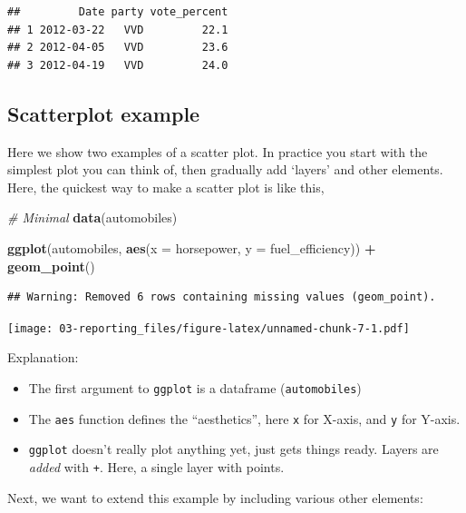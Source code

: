 \documentclass[]{book}
\newenvironment{Shaded}{\begin{snugshade}}{\end{snugshade}}
\newcommand{\CommentTok}[1]{\textcolor[rgb]{0.56,0.35,0.01}{\textit{#1}}}
\newcommand{\DataTypeTok}[1]{\textcolor[rgb]{0.13,0.29,0.53}{#1}}
\newcommand{\KeywordTok}[1]{\textcolor[rgb]{0.13,0.29,0.53}{\textbf{#1}}}
\newcommand{\NormalTok}[1]{#1}
\newcommand{\OperatorTok}[1]{\textcolor[rgb]{0.81,0.36,0.00}{\textbf{#1}}}
\newcommand{\StringTok}[1]{\textcolor[rgb]{0.31,0.60,0.02}{#1}}
\providecommand{\tightlist}{%
  \setlength{\itemsep}{0pt}\setlength{\parskip}{0pt}}
\begin{document}
\begin{verbatim}
##         Date party vote_percent
## 1 2012-03-22   VVD         22.1
## 2 2012-04-05   VVD         23.6
## 3 2012-04-19   VVD         24.0
\end{verbatim}

\hypertarget{scatterplot-example}{%
\subsection{Scatterplot example}\label{scatterplot-example}}

Here we show two examples of a scatter plot. In practice you start with the simplest plot you can think of, then gradually add `layers' and other elements. Here, the quickest way to make a scatter plot is like this,

\begin{Shaded}
\begin{Highlighting}[]
\CommentTok{# Minimal}
\KeywordTok{data}\NormalTok{(automobiles)}

\KeywordTok{ggplot}\NormalTok{(automobiles, }\KeywordTok{aes}\NormalTok{(}\DataTypeTok{x =}\NormalTok{ horsepower, }\DataTypeTok{y =}\NormalTok{ fuel_efficiency)) }\OperatorTok{+}
\StringTok{  }\KeywordTok{geom_point}\NormalTok{()}
\end{Highlighting}
\end{Shaded}

\begin{verbatim}
## Warning: Removed 6 rows containing missing values (geom_point).
\end{verbatim}

\texttt{[image: 03-reporting\_files/figure-latex/unnamed-chunk-7-1.pdf]}

Explanation:

\begin{itemize}
\tightlist
\item
  The first argument to \texttt{ggplot} is a dataframe (\texttt{automobiles})
\item
  The \texttt{aes} function defines the ``aesthetics'', here \texttt{x} for X-axis, and \texttt{y} for Y-axis.
\item
  \texttt{ggplot} doesn't really plot anything yet, just gets things ready. Layers are \emph{added} with \texttt{+}. Here, a single layer with points.
\end{itemize}

Next, we want to extend this example by including various other elements:
\end{document}
